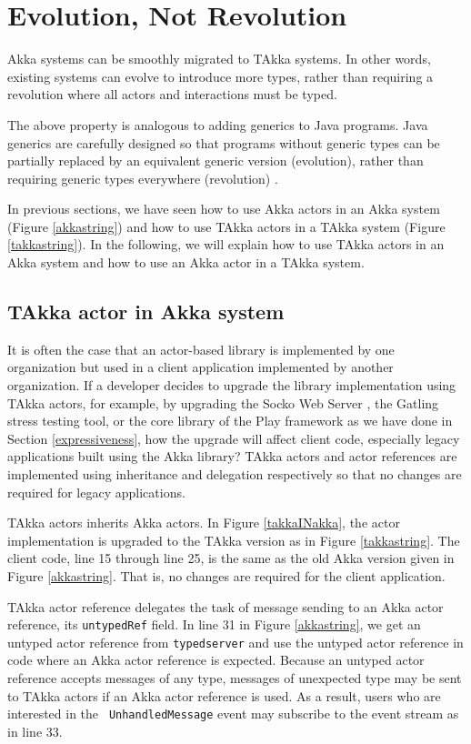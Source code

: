 \section{Evolution, Not Revolution }
\label{evolution}

Akka systems can be smoothly migrated to TAkka systems. In other words, 
existing systems can evolve to introduce more types, rather than requiring a 
revolution where all actors and interactions must be typed.

The above property is analogous to adding generics to Java programs.  Java 
generics are carefully designed so that programs without generic types can be 
partially replaced by an equivalent generic version (evolution), rather than 
requiring generic types everywhere (revolution) \cite{JGC}.

In previous sections, we have seen how to use Akka actors in an Akka 
system (Figure \ref{akkastring}) and how to use TAkka actors in a TAkka 
system (Figure \ref{takkastring}).  In the following, we will explain how to 
use TAkka actors in an Akka system and how to use an Akka actor in a TAkka 
system.


\subsection{TAkka actor in Akka system}

It is often the case that an actor-based library is implemented by one 
organization but used in a client application implemented by another 
organization.  If a developer decides to upgrade the library implementation 
using TAkka actors, for example, by upgrading the Socko Web Server 
\cite{SOCKO}, the Gatling \cite{Gatling} stress testing tool, or the core 
library of the Play framework \cite{play_doc} as we have done in Section 
\ref{expressiveness}, how the upgrade will affect client code, especially 
legacy applications built using the Akka library?  TAkka actors and actor 
references are implemented using inheritance and delegation respectively so 
that no changes are required for legacy applications.

TAkka actors inherits Akka actors.  In Figure \ref{takkaINakka}, 
the actor implementation is upgraded to the TAkka version as in Figure 
\ref{takkastring}.  The client code, line 15 through line 25, is the same as the 
old Akka version given in Figure \ref{akkastring}.  That is, no changes are 
required for the client application.

TAkka actor reference delegates the task of message sending to an 
Akka actor reference, its {\tt untypedRef} field.  In line 31 in Figure 
\ref{akkastring}, we get an untyped actor reference from {\tt typedserver} and 
use the untyped actor reference in code where an Akka actor reference is 
expected.  Because an untyped actor reference accepts messages of any type, 
messages of unexpected type may be sent to TAkka actors if an Akka actor 
reference is used.  As a result, users who are interested in the {\tt 
UnhandledMessage} event may subscribe to the event stream as in line 33.



